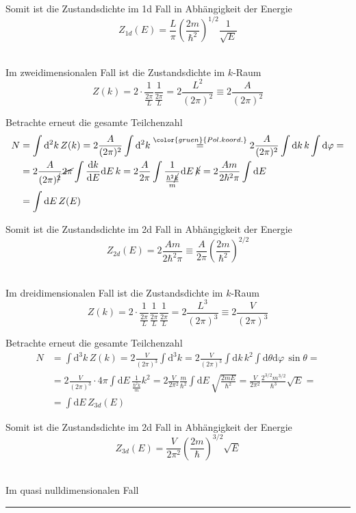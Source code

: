 \documentclass{article}
\newcommand{\diff}{\mathrm{d}}
\newcommand{\lr}[1]{\left(#1\right)}
\newcommand{\comment}[1]{{\color{gruen} {#1}}}
\begin{document}
{	Somit ist die Zustandsdichte im 1d Fall in Abhängigkeit der Energie
		$$Z_{1d}(E) = \frac{L}{\pi} \lr{\frac{2m}{\hbar^2}}^{1/2} \frac{1}{\sqrt{E}}$$
	
	\\
	Im zweidimensionalen Fall ist die Zustandsdichte im $k$-Raum
		$$Z(k) = 2\cdot \frac{1}{\frac{2\pi}{L}} \frac{1}{\frac{2\pi}{L}} = 2 \frac{L^2}{(2\pi)^2} \equiv 2 \frac{A}{(2\pi)^2}$$
	
	Betrachte erneut die gesamte Teilchenzahl
		\begin{align*}
			N &= \int \diff^2 k\, Z(k) = 2 \frac{A}{(2\pi)^2} \int \diff^2 k \stackrel{\comment{Pol.koord.}}{=} 2 \frac{A}{(2\pi)^2} \int \diff k\, k \int \diff\varphi = \\
			&= 2 \frac{A}{(2\pi)^{\cancel{2}}} \cancel{2\pi} \int \frac{\diff k}{\diff E} \diff E\, k = 2\frac{A}{2\pi} \int \frac{1}{\frac{\hbar^2 \cancel{k}}{m}} \diff E\, \cancel{k} = 2\frac{A m}{2\hbar^2 \pi} \int \diff E \\
			&= \int \diff E\, Z(E)
		\end{align*}
	
	Somit ist die Zustandsdichte im 2d Fall in Abhängigkeit der Energie
		$$Z_{2d}(E) = 2\frac{A m}{2\hbar^2 \pi} \equiv \frac{A}{2\pi} \lr{\frac{2m}{\hbar^2}}^{2/2}$$
	
	\\
	Im dreidimensionalen Fall ist die Zustandsdichte im $k$-Raum
		$$Z(k) = 2\cdot \frac{1}{\frac{2\pi}{L}} \frac{1}{\frac{2\pi}{L}} \frac{1}{\frac{2\pi}{L}} = 2 \frac{L^3}{(2\pi)^3} \equiv 2 \frac{V}{(2\pi)^3}$$
	
	Betrachte erneut die gesamte Teilchenzahl
		\begin{align*}
			N &= \int \diff^3 k\, Z(k) = 2 \frac{V}{(2\pi)^3} \int \diff^3 k = 2 \frac{V}{(2\pi)^3} \int \diff k\, k^2 \int \diff\theta \diff\varphi\, \sin\theta = \\
			&= 2 \frac{V}{(2\pi)^3} \cdot 4\pi \int \diff E\, \frac{1}{\frac{\hbar^2 k}{m}} k^2 = 2\frac{V}{2\pi^2} \frac{m}{\hbar^2} \int \diff E\, \sqrt{\frac{2mE}{\hbar^2}} = \frac{V}{2\pi^2}\frac{2^{3/2}m^{3/2}}{\hbar^3} \sqrt{E} = \\
			&= \int \diff E\, Z_{3d}(E)
		\end{align*}
	
	Somit ist die Zustandsdichte im 2d Fall in Abhängigkeit der Energie
		$$Z_{3d}(E) = \frac{V}{2\pi^2} \lr{ \frac{2m}{\hbar} }^{3/2} \sqrt{E}$$
	
	\\
	Im quasi nulldimensionalen Fall 
\hrule
}
\end{document}
